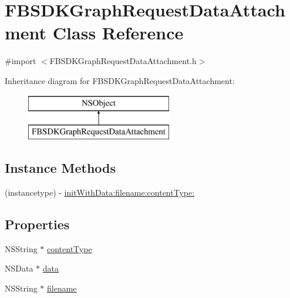 \hypertarget{interface_f_b_s_d_k_graph_request_data_attachment}{}\section{F\+B\+S\+D\+K\+Graph\+Request\+Data\+Attachment Class Reference}
\label{interface_f_b_s_d_k_graph_request_data_attachment}


{\ttfamily \#import $<$F\+B\+S\+D\+K\+Graph\+Request\+Data\+Attachment.\+h$>$}

Inheritance diagram for F\+B\+S\+D\+K\+Graph\+Request\+Data\+Attachment\+:\begin{figure}[H]
\begin{center}
\leavevmode
\includegraphics[height=2.000000cm]{interface_f_b_s_d_k_graph_request_data_attachment}
\end{center}
\end{figure}
\subsection*{Instance Methods}
\begin{DoxyCompactItemize}
\item 
(instancetype) -\/ \hyperlink{interface_f_b_s_d_k_graph_request_data_attachment_a6a1772508de20c0d0546d4e079139b6b}{init\+With\+Data\+:filename\+:content\+Type\+:}
\end{DoxyCompactItemize}
\subsection*{Properties}
\begin{DoxyCompactItemize}
\item 
N\+S\+String $\ast$ \hyperlink{interface_f_b_s_d_k_graph_request_data_attachment_a721d770bcb1b89e4e23d084320636651}{content\+Type}
\item 
N\+S\+Data $\ast$ \hyperlink{interface_f_b_s_d_k_graph_request_data_attachment_add74d6b28d7630f13c711afbfed387c6}{data}
\item 
N\+S\+String $\ast$ \hyperlink{interface_f_b_s_d_k_graph_request_data_attachment_a65650c18882e736fc9ddc322008a4a88}{filename}
\end{DoxyCompactItemize}


